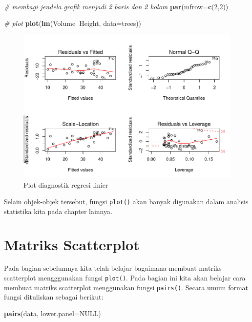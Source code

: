 \documentclass[]{book}
\newenvironment{Shaded}{\begin{snugshade}}{\end{snugshade}}
\newcommand{\KeywordTok}[1]{\textcolor[rgb]{0.13,0.29,0.53}{\textbf{#1}}}
\newcommand{\DataTypeTok}[1]{\textcolor[rgb]{0.13,0.29,0.53}{#1}}
\newcommand{\DecValTok}[1]{\textcolor[rgb]{0.00,0.00,0.81}{#1}}
\newcommand{\CommentTok}[1]{\textcolor[rgb]{0.56,0.35,0.01}{\textit{#1}}}
\newcommand{\OtherTok}[1]{\textcolor[rgb]{0.56,0.35,0.01}{#1}}
\newcommand{\OperatorTok}[1]{\textcolor[rgb]{0.81,0.36,0.00}{\textbf{#1}}}
\newcommand{\NormalTok}[1]{#1}
\begin{document}
\begin{Shaded}
\begin{Highlighting}[]
\CommentTok{# membagi jendela grafik menjadi 2 baris dan 2 kolom}
\KeywordTok{par}\NormalTok{(}\DataTypeTok{mfrow=}\KeywordTok{c}\NormalTok{(}\DecValTok{2}\NormalTok{,}\DecValTok{2}\NormalTok{))}

\CommentTok{# plot}
\KeywordTok{plot}\NormalTok{(}\KeywordTok{lm}\NormalTok{(Volume}\OperatorTok{~}\NormalTok{Height, }\DataTypeTok{data=}\NormalTok{trees))}
\end{Highlighting}
\end{Shaded}

\begin{figure}

{\centering \includegraphics[width=0.8\linewidth]{EnvStat_files/figure-latex/diag-1} 

}

\caption{Plot diagnostik regresi linier}\label{fig:diag}
\end{figure}

Selain objek-objek tersebut, fungsi \texttt{plot()} akan banyak
digunakan dalam analisis statistika kita pada chapter lainnya.

\section{Matriks Scatterplot}\label{matriks-scatterplot}

Pada bagian sebelumnya kita telah belajar bagaimana membuat matriks
scatterplot mengggunakan fungsi \texttt{plot()}. Pada bagian ini kita
akan belajar cara membuat matriks scatterplot menggunakan fungsi
\texttt{pairs()}. Secara umum format fungsi dituliskan sebagai berikut:

\begin{Shaded}
\begin{Highlighting}[]
\KeywordTok{pairs}\NormalTok{(data, }\DataTypeTok{lower.panel=}\OtherTok{NULL}\NormalTok{)}
\end{Highlighting}
\end{Shaded}
\end{document}
